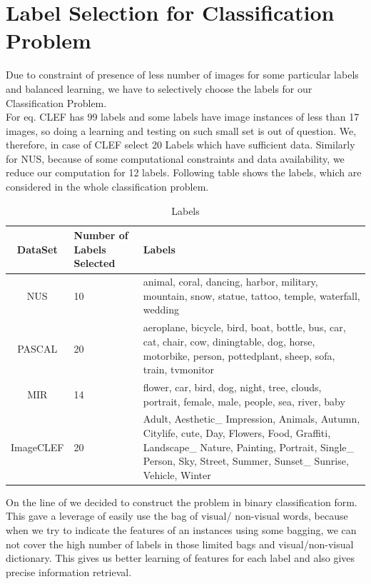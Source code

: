 \vspace*{1cm}
\section{Label Selection for Classification Problem}
Due to constraint of presence of less number of images for some particular labels and balanced learning, we have to selectively choose the labels for our Classification Problem. \\
For eq. CLEF has 99 labels and some labels have image instances of less than 17 images, so doing a learning and testing on such small set is out of question. We, therefore, in case of CLEF select 20 Labels which have sufficient data. Similarly for NUS, because of some computational constraints and data availability, we reduce our computation for 12 labels. Following table shows the labels, which are considered in the whole classification problem. \\
\begin{table}[ht]
\caption{Labels} %
\centering %
\begin{tabular}{|c|p{2cm}|p{7cm}| } %
\hline\hline %
DataSet & Number of Labels Selected & Labels \\ [0.5ex] %
\hline %
NUS & 10 & animal, coral, dancing, harbor, military, mountain, snow, statue, tattoo, temple, waterfall, wedding \\  [1ex]
PASCAL & 20 & aeroplane, bicycle, bird, boat, bottle, bus, car, cat, chair, cow, diningtable, dog, horse, motorbike, person, pottedplant, sheep, sofa, train, tvmonitor \\  [1ex]
MIR & 14 & flower, car, bird, dog, night, tree, clouds, portrait, female, male, people, sea, river, baby \\  [1ex]
ImageCLEF & 20 & Adult, Aesthetic\_ Impression, Animals, Autumn, Citylife, cute, Day, Flowers, Food, Graffiti, Landscape\_ Nature, Painting, Portrait, Single\_ Person, Sky, Street, Summer, Sunset\_ Sunrise, Vehicle, Winter \\  [1ex]
\hline %
\end{tabular}
\label{table:nonlin} %
\end{table}
On the line of \cite{Jure} we decided to construct the problem in binary classification form. This gave a leverage of easily use the bag of visual/ non-visual words, because when we try to indicate the features of an instances using some bagging, we can not cover the high number of labels in those limited bags and visual/non-visual dictionary. This gives us better learning of features for each label and also gives precise information retrieval. 
